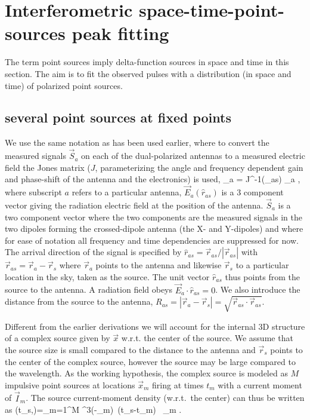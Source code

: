 \section{Interferometric space-time-point-sources peak fitting}

The term point sources imply delta-function sources in space and time in this section. The aim is to fit the observed pulses with a distribution (in space and time) of polarized point sources.

\subsection{several  point sources at fixed points}

We use the same notation as has been used earlier\cite{Scholten:2022}, where to convert the measured signals $\vec{S}_a$ on each of the dual-polarized antennas to a measured electric field the Jones matrix ($J$, parameterizing the angle and frequency dependent gain and phase-shift of the antenna and the electronics) is used,
\beq
{}_a = J^{-1}(_{as}) _a \;, 
\eeq
where subscript $a$ refers to a particular antenna, $\vec{E}_a(\hat{r}_{as})$ is a 3 component vector giving the radiation electric field at the position of the antenna. $\vec{S}_a$ is a two component vector where the two components are the measured signals in the two dipoles forming the crossed-dipole antenna (the X- and Y-dipoles) and where for  ease of notation all frequency and time dependencies are suppressed for now. The arrival direction of the signal is specified by $\hat{r}_{as}=\vec{r}_{as}/|\vec{r}_{as}|$ with $\vec{r}_{as}=\vec{r}_a-\vec{r}_s$ where $\vec{r}_a$ points to the antenna and likewise $\vec{r}_s$ to a particular location in the sky, taken as the source. The unit vector  $\hat{r}_{as}$ thus points from the source to the antenna. A radiation field obeys  $\vec{E}_a \cdot \hat{r}_{as}=0$. We also introduce the distance from the source to the antenna, $R_{as}=|\vec{r}_a-\vec{r}_s|=\sqrt{\vec{r}_{as} \cdot \vec{r}_{as}}$.

Different from the earlier derivations we will account for the internal 3D structure of a complex source given by $\vec{x}$ w.r.t. the center of the source. We assume that the source size is small compared to the distance to the antenna and $\vec{r}_s$ points to the center of the complex source, however the source may be large compared to the wavelength. As the working hypothesis, the complex source is modeled as $M$ impulsive point sources at locations $\vec{x}_m$ firing at times $t_m$ with a current moment of $\vec{I}_m$. The source current-moment density (w.r.t.\ the center) can thus be written as
\beq
{}(t_s,)=\sum_{m=1}^M \delta^3(-_m) \,\delta(t_s-t_m) \, _m \;. 
\eeq

